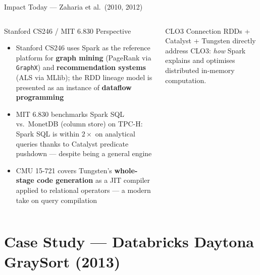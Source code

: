 \documentclass[aspectratio=169,10pt]{beamer}
\begin{document}
\begin{frame}{Impact Today — Zaharia et al.\ (2010, 2012)}
\begin{columns}[T]
      \begin{exampleblock}{Stanford CS246 / MIT 6.830 Perspective}
        \begin{itemize}
          \item Stanford CS246 uses Spark as the reference platform
                for \textbf{graph mining} (PageRank via
                \texttt{GraphX}) and \textbf{recommendation systems}
                (ALS via MLlib); the RDD lineage model is presented
                as an instance of \textbf{dataflow programming}
          \item MIT 6.830 benchmarks Spark SQL vs.\ MonetDB
                (column store) on TPC-H: Spark SQL is within
                $2\times$ on analytical queries thanks to Catalyst
                predicate pushdown — despite being a general engine
          \item CMU 15-721 covers Tungsten's \textbf{whole-stage
                code generation} as a JIT compiler applied to
                relational operators — a modern take on query compilation
        \end{itemize}
      \end{exampleblock}
      \vspace{4pt}
      \begin{alertblock}{CLO3 Connection}
        RDDs + Catalyst + Tungsten directly address CLO3:
        \emph{how} Spark explains and optimises distributed
        in-memory computation.
      \end{alertblock}
  \end{columns}
\end{frame}

\section{Case Study — Databricks Daytona GraySort (2013)}
\end{document}
